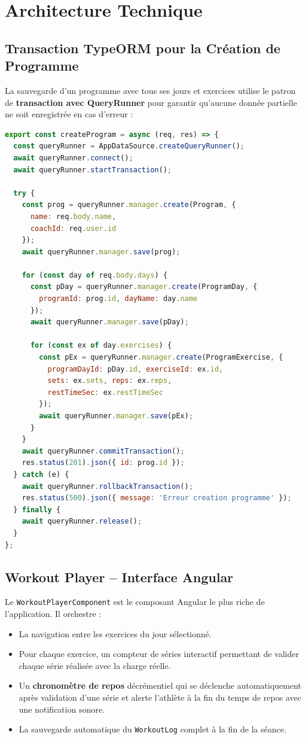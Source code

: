\section{Architecture Technique}


\subsection{Transaction TypeORM pour la Création de Programme}
La sauvegarde d'un programme avec tous ses jours et exercices utilise le patron de \textbf{transaction avec QueryRunner} pour garantir qu'aucune donnée partielle ne soit enregistrée en cas d'erreur :

\begin{lstlisting}[language=JavaScript, caption=Création transactionnelle d'un programme (ProgramController.ts)]
export const createProgram = async (req, res) => {
  const queryRunner = AppDataSource.createQueryRunner();
  await queryRunner.connect();
  await queryRunner.startTransaction();

  try {
    const prog = queryRunner.manager.create(Program, {
      name: req.body.name,
      coachId: req.user.id
    });
    await queryRunner.manager.save(prog);

    for (const day of req.body.days) {
      const pDay = queryRunner.manager.create(ProgramDay, {
        programId: prog.id, dayName: day.name
      });
      await queryRunner.manager.save(pDay);

      for (const ex of day.exercises) {
        const pEx = queryRunner.manager.create(ProgramExercise, {
          programDayId: pDay.id, exerciseId: ex.id,
          sets: ex.sets, reps: ex.reps,
          restTimeSec: ex.restTimeSec
        });
        await queryRunner.manager.save(pEx);
      }
    }
    await queryRunner.commitTransaction();
    res.status(201).json({ id: prog.id });
  } catch (e) {
    await queryRunner.rollbackTransaction();
    res.status(500).json({ message: 'Erreur creation programme' });
  } finally {
    await queryRunner.release();
  }
};
\end{lstlisting}

\subsection{Workout Player -- Interface Angular}
Le \texttt{WorkoutPlayerComponent} est le composant Angular le plus riche de l'application. Il orchestre :
\begin{itemize}
    \item La navigation entre les exercices du jour sélectionné.
    \item Pour chaque exercice, un compteur de séries interactif permettant de valider chaque série réalisée avec la charge réelle.
    \item Un \textbf{chronomètre de repos} décrémentiel qui se déclenche automatiquement après validation d'une série et alerte l'athlète à la fin du temps de repos avec une notification sonore.
    \item La sauvegarde automatique du \texttt{WorkoutLog} complet à la fin de la séance.
\end{itemize}

